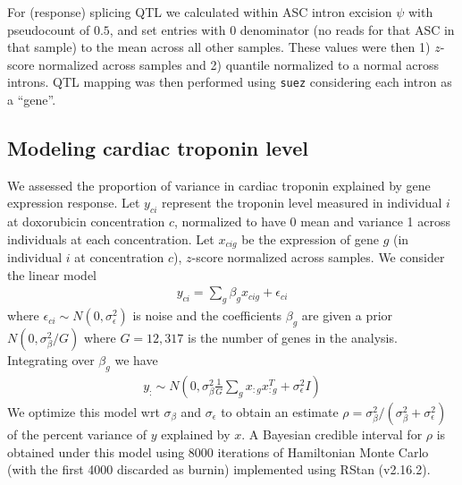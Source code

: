 \documentclass{article}
\begin{document}
For (response) splicing QTL we calculated within ASC intron excision $\psi$ with pseudocount of $0.5$, and set entries with $0$ denominator (no reads for that ASC in that sample) to the mean across all other samples. These values were then 1) $z$-score normalized across samples and 2) quantile normalized to a normal across introns. QTL mapping was then performed using \texttt{suez} considering each intron as a ``gene''. 

\subsection*{Modeling cardiac troponin level}

We assessed the proportion of variance in cardiac troponin explained by gene expression response. Let $y_{ci}$ represent the troponin level measured in individual $i$ at doxorubicin concentration $c$, normalized to have 0 mean and variance 1 across individuals at each concentration. Let $x_{cig}$ be the expression of gene $g$ (in individual $i$ at concentration $c$), $z$-score normalized across samples. We consider the linear model 
\begin{align}
y_{ci} = \sum_g \beta_g x_{cig} + \epsilon_{ci} \label{eq:troponin_normalized}
\end{align}
where $\epsilon_{ci} \sim N(0,\sigma_\epsilon^2)$ is noise and the coefficients $\beta_g$ are given a prior $N(0, \sigma_\beta^2 / G )$ where $G=12,317$ is the number of genes in the analysis. Integrating over $\beta_g$ we have 
\begin{align}
y_{:} \sim N\left(0 , \sigma_\beta^2 \frac{1}{G} \sum_g x_{:g} x_{:g}^T + \sigma_\epsilon^2 I \right)
\end{align}
We optimize this model wrt $\sigma_\beta$ and $\sigma_\epsilon$ to obtain an estimate $\rho = \sigma_\beta^2 / (\sigma_\beta^2 + \sigma_\epsilon^2)$ of the percent variance of $y$ explained by $x$. A Bayesian credible interval for $\rho$ is obtained under this model using 8000 iterations of Hamiltonian Monte Carlo (with the first 4000 discarded as burnin) implemented using RStan\cite{carpenter2016stan} (v2.16.2). 
\end{document}
